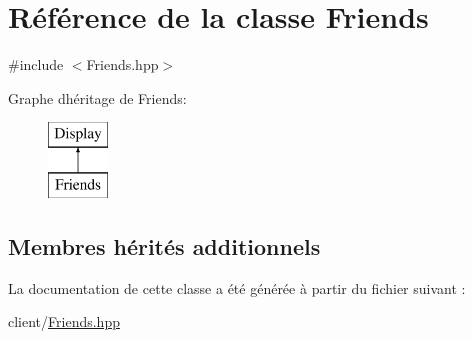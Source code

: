 \hypertarget{classFriends}{}\section{Référence de la classe Friends}
\label{classFriends}


{\ttfamily \#include $<$Friends.\+hpp$>$}

Graphe d\textquotesingle{}héritage de Friends\+:\begin{figure}[H]
\begin{center}
\leavevmode
\includegraphics[height=2.000000cm]{classFriends}
\end{center}
\end{figure}
\subsection*{Membres hérités additionnels}


La documentation de cette classe a été générée à partir du fichier suivant \+:\begin{DoxyCompactItemize}
\item 
client/\hyperlink{Friends_8hpp}{Friends.\+hpp}\end{DoxyCompactItemize}
